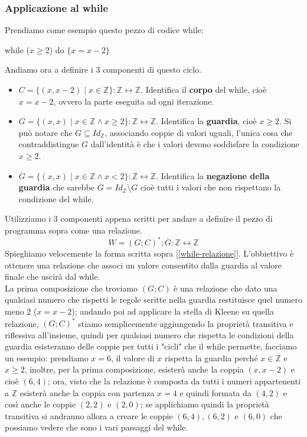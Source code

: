 \subsubsection{Applicazione al while}
Prendiamo come esempio questo pezzo di codice while:
\begin{center}
    while ($x \geq 2$) do $\{x = x - 2\}$
\end{center}
Andiamo ora a definire i 3 componenti di questo ciclo.
\begin{itemize}
    \item $C = \{(x, x-2) \mid x \in \mathbb{Z}\}: \mathbb{Z} \leftrightarrow \mathbb{Z}$.
    Identifica il \textbf{corpo} del while, cioè $x = x - 2$, ovvero la parte eseguita ad ogni iterazione.
    
    \item $G = \{(x,x) \mid x \in \mathbb{Z} \land x \geq 2\}: \mathbb{Z} \leftrightarrow \mathbb{Z}$. Identifica la \textbf{guardia}, cioè $x \geq 2$. Si può notare che $G \subseteq Id_{\mathbb{Z}}$, associando coppie di valori uguali, l'unica cosa che contraddistingue $G$ dall'identità è che i valori devono soddisfare la condizione $x \geq 2$.
    
    \item $\overline{G} = \{(x,x) \mid x \in \mathbb{Z} \land x < 2\} : \mathbb{Z} \leftrightarrow \mathbb{Z}$.
    Identifica la \textbf{negazione della guardia} che sarebbe $\overline{G} = Id_{\mathbb{Z}} \setminus G$ cioè tutti i valori che non rispettano la condizione del while.
\end{itemize}
Utilizziamo i 3 componenti appena scritti per andare a definire il pezzo di programma sopra come una relazione.
\begin{equation}\label{while-relazione}
    W = (G;C)^\ast;\overline{G}:\mathbb{Z}\leftrightarrow \mathbb{Z}
\end{equation}
Spieghiamo velocemente la forma scritta sopra [\ref{while-relazione}]. L'obbiettivo è ottenere una relazione che associ un valore consentito dalla guardia al valore finale che uscirà dal while.\\
La prima composizione che troviamo $(G;C)$ è una relazione che dato una qualsiasi numero che rispetti le regole scritte nella guardia restituisce quel numero meno $2$ ($x = x - 2$); andando poi ad applicare la stella di Kleene su quella relazione, $(G;C)^\ast$ stiamo semplicemente aggiungendo la proprietà transitiva e riflessiva all'insieme, quindi per qualsiasi numero che rispetta le condizioni della guardia esisteranno delle coppie per tutti i "cicli" che il while permette, facciamo un esempio: prendiamo $x = 6$, il valore di $x$ rispetta la guardia perché $x \in \mathbb{Z}$ e $x \geq 2$, inoltre, per la prima composizione, esisterà anche la coppia $(x, x-2)$ e cioè $(6,4)$; ora, visto che la relazione è composta da tutti i numeri appartenenti a $\mathbb{Z}$ esisterà anche la coppia con partenza $x = 4$ e quindi formata da $(4,2)$ e così anche le coppie $(2,2)$ e $(2,0)$; se applichiamo quindi la proprietà transitiva si andranno allora a creare le coppie $(6,4), (6,2)$ e $(6,0)$ che possiamo vedere che sono i vari passaggi del while.\\
